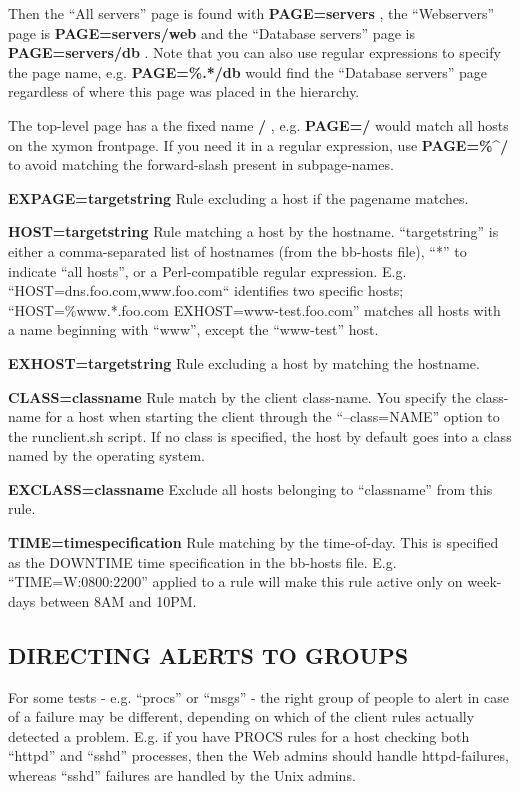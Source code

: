   Then the ``All servers'' page is found with \textbf{PAGE=servers}
, the ``Webservers'' page is \textbf{PAGE=servers/web}
 and the ``Database servers'' page is \textbf{PAGE=servers/db}
. Note that you can also use regular expressions to specify the page name, e.g. \textbf{PAGE=\%.*/db}
 would find the ``Database servers'' page regardless of where this page was placed in the hierarchy. 


  The top-level page has a the fixed name \textbf{/}
, e.g. \textbf{PAGE=/} would match all hosts on the xymon
  frontpage. If you need it in a regular expression, use
  \textbf{PAGE=\%\^{}/} to avoid matching the forward-slash present in
  subpage-names. 



 \textbf{EXPAGE=targetstring}
 Rule excluding a host if the pagename matches. 


 \textbf{HOST=targetstring}
 Rule matching a host by the hostname. ``targetstring'' is either a
 comma-separated list of hostnames (from the bb-hosts file), ``*'' to
 indicate ``all hosts'', or a Perl-compatible regular
 expression. E.g. ``HOST=dns.foo.com,www.foo.com`` identifies two
 specific hosts; ``HOST=\%www.*.foo.com EXHOST=www-test.foo.com''
 matches all hosts with a name beginning with ``www'', except the
 ``www-test'' host. 



 \textbf{EXHOST=targetstring}
 Rule excluding a host by matching the hostname. 


 \textbf{CLASS=classname}
 Rule match by the client class-name. You specify the class-name for a
 host when starting the client through the ``--class=NAME'' option to
 the runclient.sh script. If no class is specified, the host by
 default goes into a class named by the operating system. 



 \textbf{EXCLASS=classname}
 Exclude all hosts belonging to ``classname'' from this rule. 


 \textbf{TIME=timespecification}
 Rule matching by the time-of-day. This is specified as the DOWNTIME time specification in the bb-hosts file. E.g. ``TIME=W:0800:2200'' applied to a rule will make this rule active only on week-days between 8AM and 10PM. 


 
\subsection{DIRECTING ALERTS TO GROUPS}
 For some tests - e.g. ``procs'' or ``msgs'' - the right group of
 people to alert in case of a failure may be different, depending on
 which of the client rules actually detected a problem. E.g. if you
 have PROCS rules for a host checking both ``httpd'' and ``sshd''
 processes, then the Web admins should handle httpd-failures, whereas
 ``sshd'' failures are handled by the Unix admins. 



